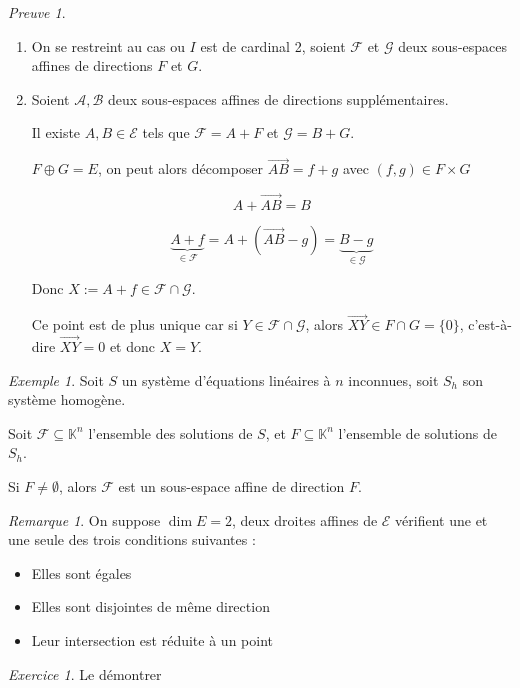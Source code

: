 \documentclass[]{article}
\theoremstyle{remark}
\newtheorem{myrem}{Remarque}
\newtheorem{myexer}{Exercice}
\newtheorem{myproof}{Preuve}
\newtheorem{myexmpl}{Exemple}
\theoremstyle{definition}
\begin{document}
\begin{myproof}
	\leavevmode
	\begin{enumerate}
		\item On se restreint au cas ou $I$ est de cardinal 2, soient $\mathcal{F}$ et $\mathcal{G}$ deux sous-espaces affines de directions $F$ et $G$.
		
		\item Soient $\mathcal{A}, \mathcal{B}$ deux sous-espaces affines de directions supplémentaires.
		
		Il existe $A, B \in \mathcal{E}$ tels que $\mathcal{F} = A + F$  et $\mathcal{G} = B + G$.
		
		$F \oplus G = E$, on peut alors décomposer $\overrightarrow{AB} = f + g$ avec $(f,g) \in F \times G$
		
		$$A + \overrightarrow{AB} = B$$
		
		$$\underbrace{A + f}_{\in \mathcal{F}} = A + (\overrightarrow{AB} - g) = \underbrace{B - g}_{\in \mathcal{G}}$$
		
		Donc $X := A + f \in \mathcal{F} \cap \mathcal{G}$.
		
		Ce point est de plus unique car si $Y \in \mathcal{F} \cap \mathcal{G}$, alors $\overrightarrow{XY} \in F \cap G = \{0\}$, c'est-à-dire $\overrightarrow{XY} = 0$ et donc $X = Y$.
	\end{enumerate}
\end{myproof}

\begin{myexmpl}
	\item Soit $S$ un système d'équations linéaires à $n$ inconnues, soit $S_h$ son système homogène.
	
	Soit $\mathcal{F} \subseteq \mathbb{K}^n$ l'ensemble des solutions de $S$, et $F \subseteq \mathbb{K}^n$ l'ensemble de solutions de $S_h$.
	
	Si $F \neq \emptyset$, alors $\mathcal{F}$ est un sous-espace affine de direction $F$.
\end{myexmpl}

\begin{myrem}
	On suppose $\dim E = 2$, deux droites affines de $\mathcal{E}$ vérifient une et une seule des trois conditions suivantes :
	\begin{itemize}
		\item Elles sont égales
		\item Elles sont disjointes de même direction
		\item Leur intersection est réduite à un point
	\end{itemize}
	
	\begin{myexer}
		Le démontrer
		\label{exo13}
	\end{myexer}
\end{myrem}
\end{document}
